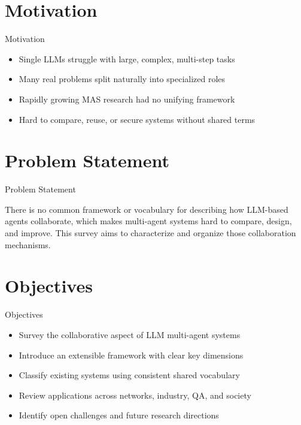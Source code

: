 \documentclass[10pt]{beamer}
\begin{document}
\section{Motivation}
\begin{frame}{Motivation}
\begin{itemize}
  \item Single LLMs struggle with large, complex, multi-step tasks
  \item Many real problems split naturally into specialized roles
  \item Rapidly growing MAS research had no unifying framework
  \item Hard to compare, reuse, or secure systems without shared terms
\end{itemize}
\end{frame}

\section{Problem Statement}
\begin{frame}{Problem Statement}
  \begin{block}{}
  There is no common framework or vocabulary for describing how LLM-based agents collaborate, which makes multi-agent systems hard to compare, design, and improve. This survey aims to characterize and organize those collaboration mechanisms.
  \end{block}
\end{frame}

\section{Objectives}
\begin{frame}{Objectives}
\begin{itemize}
  \item Survey the collaborative aspect of LLM multi-agent systems
  \item Introduce an extensible framework with clear key dimensions
  \item Classify existing systems using consistent shared vocabulary
  \item Review applications across networks, industry, QA, and society
  \item Identify open challenges and future research directions
\end{itemize}
\end{frame}
\end{document}
